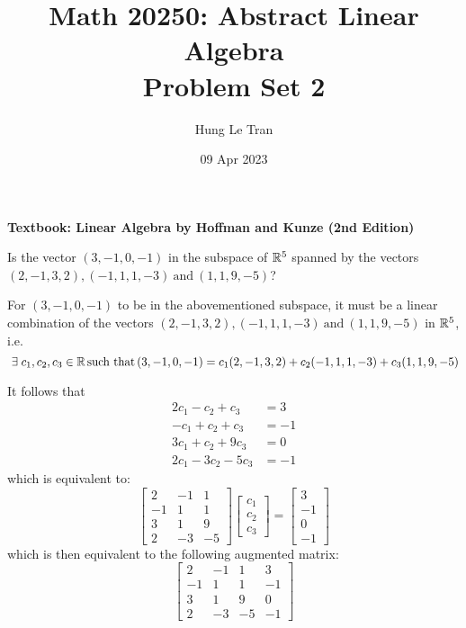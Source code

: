 \documentclass[a4paper, 11pt]{article}
\title{Math 20250: Abstract Linear Algebra \\ \large Problem Set 2}
\date{09 Apr 2023}
\author{Hung Le Tran}
\begin{document}
\maketitle
\newpage
\setcounter{section}{2}
\textbf{Textbook: Linear Algebra by Hoffman and Kunze (2nd Edition)}
\begin{problem} 
Is the vector \((3, -1, 0, -1)\) in the subspace of \(\mathbb{R}^5\) spanned by the vectors \((2, -1, 3, 2), (-1, 1, 1, -3) \:\text{and}\: (1, 1, 9, -5)\)?
\end{problem}
\begin{solution}
    For \((3, -1, 0, -1)\) to be in the abovementioned subspace, it must be a linear combination of the vectors \((2, -1, 3, 2), (-1, 1, 1, -3) \:\text{and}\: (1, 1, 9, -5)\) in \(\mathbb{R}^5\), i.e. \[
        \exists c_1, c_2, c_3 \in \bbr \st (3, -1, 0, -1) = c_1(2, -1, 3, 2) + c_2(-1, 1, 1, -3) + c_3(1, 1, 9, -5)
    \]

    It follows that
    \begin{align*}
        2c_1 -c_2 + c_3   & =3   \\
        -c_1 + c_2 + c_3  & = -1 \\
        3c_1 + c_2 + 9c_3 & = 0  \\
        2c_1 -3c_2 -5c_3  & = -1
    \end{align*}
    which is equivalent to:
    \[
        \left[\begin{array}{ccc}
                2  & -1 & 1  \\
                -1 & 1  & 1  \\
                3  & 1  & 9  \\
                2  & -3 & -5
            \end{array}\right]\left[\begin{array}{c}
                c_1 \\
                c_2 \\
                c_3
            \end{array}\right] = \left[\begin{array}{c}
                3  \\
                -1 \\
                0  \\
                -1
            \end{array}\right]
    \]
    which is then equivalent to the following augmented matrix:
    \[
        \left[\begin{array}{cccc}
                2  & -1 & 1  & 3  \\
                -1 & 1  & 1  & -1 \\
                3  & 1  & 9  & 0  \\
                2  & -3 & -5 & -1
            \end{array}\right]
    \]


\end{solution}
\end{document}
